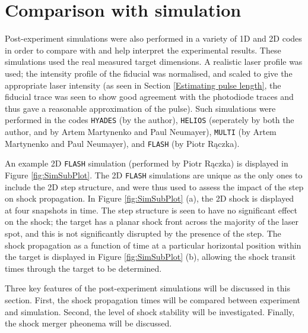 \section{Comparison with simulation} \label{Post shock simulations}

Post-experiment simulations were also performed in a variety of 1D and 2D codes in order to compare with and help interpret the experimental results. These simulations used the real measured target dimensions. A realistic laser profile was used; the intensity profile of the fiducial was normalised, and scaled to give the appropriate laser intensity (as seen in Section \ref{Estimating pulse length}, the fiducial trace was seen to show good agreement with the photodiode traces and thus gave a reasonable approximation of the pulse). Such simulations were performed in the codes \texttt{HYADES} (by the author), \texttt{HELIOS} (seperately by both the author, and by Artem Martynenko and Paul Neumayer), \texttt{MULTI} (by Artem Martynenko and Paul Neumayer), and \texttt{FLASH} (by Piotr R\k{a}czka).

An example 2D \texttt{FLASH} simulation (performed by Piotr R\k{a}czka) is displayed in Figure \ref{fig:SimSubPlot}. The 2D \texttt{FLASH} simulations are unique as the only ones to include the 2D step structure, and were thus used to assess the impact of the step on shock propagation. In Figure \ref{fig:SimSubPlot} (a), the 2D shock is displayed at four snapshots in time. The step structure is seen to have no significant effect on the shock; the target has a planar shock front across the majority of the laser spot, and this is not significantly disrupted by the presence of the step. The shock propagation as a function of time at a particular horizontal position within the target is displayed in Figure \ref{fig:SimSubPlot} (b), allowing the shock transit times through the target to be determined.

Three key features of the post-experiment simulations will be discussed in this section. First, the shock propagation times will be compared between experiment and simulation. Second, the level of shock stability will be investigated. Finally, the shock merger pheonema will be discussed.


